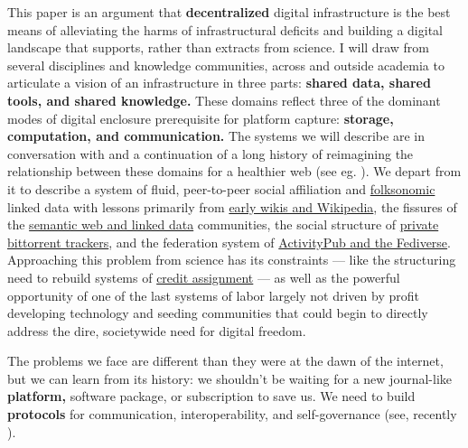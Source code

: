 This paper is an argument that \textbf{decentralized} digital
infrastructure is
the best means of alleviating the harms of infrastructural deficits and
building a digital landscape that supports, rather than extracts from
science. I will draw from several disciplines and knowledge communities,
across and outside academia to articulate a vision of an infrastructure
in three parts: \textbf{shared data, shared tools, and shared
knowledge.} These domains reflect three of the dominant modes of digital
enclosure prerequisite for platform capture: \textbf{storage,
computation, and communication.} The systems we will describe are in
conversation with and a continuation of a long history of reimagining
the relationship between these domains for a healthier web (see eg. \citep{berners-leeSociallyAwareCloud2009, berners-leeWebServicesOverview2009} ). We depart from it to describe
a system of fluid, peer-to-peer social affiliation and
\protect\hyperlink{federated-systems-of-language}{folksonomic} linked
data with lessons primarily from \protect\hyperlink{the-wiki-way}{early
wikis and Wikipedia}, the fissures of the
\protect\hyperlink{neatness-vs-scruffiness}{semantic web and linked
data} communities, the social structure of
\protect\hyperlink{archives-need-communities}{private bittorrent
trackers}, and the federation system of
\protect\hyperlink{forums--feeds}{ActivityPub and the Fediverse}.
Approaching this problem from science has its constraints --- like the
structuring need to rebuild systems of
\protect\hyperlink{credit-assignment}{credit assignment} --- as well as
the powerful opportunity of one of the last systems of labor largely not
driven by profit developing technology and seeding communities that
could begin to directly address the dire, societywide need for digital
freedom.

The problems we face are different than they were at the dawn of the
internet, but we can learn from its history: we shouldn't be waiting for
a new journal-like \textbf{platform,} software package, or subscription
to save us. We need to build \textbf{protocols} for communication,
interoperability, and self-governance (see, recently \citep{brembsReplacingAcademicJournals2021} ).

